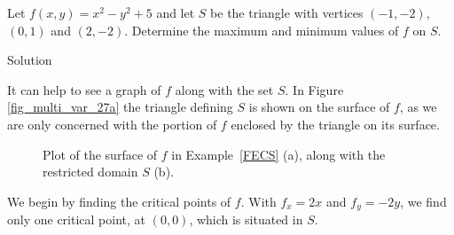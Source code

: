\begin{example}
\label{FECS}
Let $f(x,y) = x^2-y^2+5$ and let $S$ be the triangle with vertices $(-1,-2)$, $(0,1)$ and $(2,-2)$. Determine the maximum and minimum values of $f$ on $S$.

Solution 

It can help to see a graph of $f$ along with the set $S$. In Figure \ref{fig_multi_var_27a} the triangle defining $S$ is shown on the surface of $f$, as we are only concerned with the portion of $f$ enclosed by the triangle on its surface. 


\begin{figure}[H]
\centering
\qquad
{}
\caption{Plot of the surface of $f$ in Example~\ref{FECS} (a), along with the restricted domain $S$ (b). \label{fig_multi_var_27}}
\end{figure}


We begin by finding the critical points of $f$. With $f_x = 2x$ and $f_y = -2y$, we find only one critical point, at $(0,0)$, which is situated in $S$. 


\end{example}
